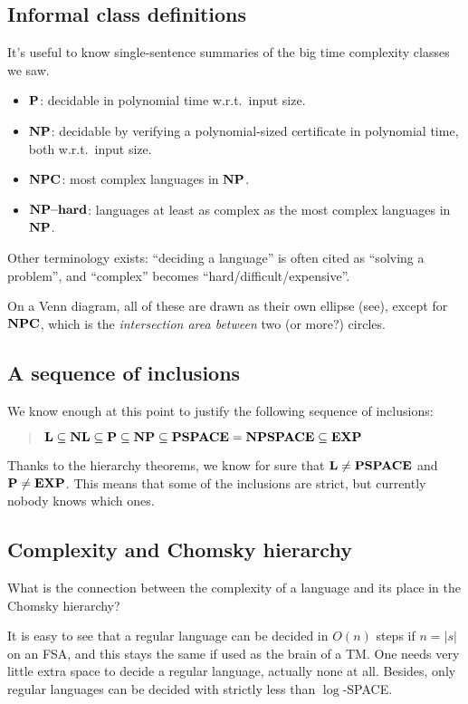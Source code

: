 \subsection{Informal class definitions}
It's useful to know single-sentence summaries of the big time complexity classes we saw.
\begin{itemize}
	\item $\P$: decidable in polynomial time w.r.t.\ input size.
	\item $\NP$: decidable by verifying a polynomial-sized certificate in polynomial time, both w.r.t.\ input size.
	\item $\NPC$: most complex languages in $\NP$.
	\item $\NPhard$: languages at least as complex as the most complex languages in $\NP$.
\end{itemize}
Other terminology exists: ``deciding a language'' is often cited as ``solving a problem'', and ``complex'' becomes ``hard/difficult/expensive''.

On a Venn diagram, all of these are drawn as their own ellipse (see), except for $\NPC$, which is the \emph{intersection area between} two (or more?) circles.

\subsection{A sequence of inclusions}
We know enough at this point to justify the following
sequence of inclusions:

\begin{verse}
$\LL \subseteq \NL \subseteq \P \subseteq \NP \subseteq \PSPACE
  = \NPSPACE \subseteq \EXP$
\end{verse}

Thanks to the hierarchy theorems, we know for sure that
$\LL \neq \PSPACE$ and $\P \neq \EXP$. This means that some of the
inclusions are strict, but currently nobody knows which ones.


\subsection{Complexity and Chomsky hierarchy}

What is the connection between the complexity of a language and its
place in the Chomsky hierarchy?

It is easy to see that a regular language can be decided in $O(n)$
steps if $n = |s|$ on an FSA, and this stays the same if used as the brain of a TM.
One needs very little extra space to
decide a regular language, actually none at all. Besides, only regular
languages can be decided with strictly less than $\log$-SPACE.

